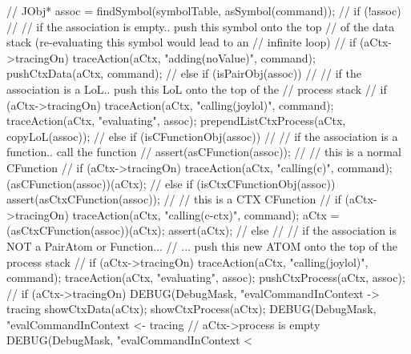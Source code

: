 {{{      //
      JObj* assoc = findSymbol(symbolTable, asSymbol(command));
      //
      if (!assoc) {
        //
        // if the association is empty.. push this symbol onto the top
        // of the data stack (re-evaluating this symbol would lead to an
        // infinite loop)
        //
        if (aCtx->tracingOn)
          traceAction(aCtx, "adding(noValue)", command);
        pushCtxData(aCtx, command);
        //
      } else if (isPairObj(assoc)) {
        //
        // if the association is a LoL.. push this LoL onto the top of the
        // process stack
        //
        if (aCtx->tracingOn) {
          traceAction(aCtx, "calling(joylol)", command);
          traceAction(aCtx, "evaluating",      assoc);
        }
        prependListCtxProcess(aCtx, copyLoL(assoc));
        //
      } else if (isCFunctionObj(assoc)) {
        //
        // if the association is a function.. call the function
        //
        assert(asCFunction(assoc));
        //
        // this is a normal CFunction
        //
        if (aCtx->tracingOn)
          traceAction(aCtx, "calling(c)", command);
        (asCFunction(assoc))(aCtx);
        //
      } else if (isCtxCFunctionObj(assoc)) {
        assert(asCtxCFunction(assoc));
        //
        // this is a CTX CFunction
        //
        if (aCtx->tracingOn) 
          traceAction(aCtx, "calling(c-ctx)", command);
        aCtx = (asCtxCFunction(assoc))(aCtx);
        assert(aCtx);
        //
      } else {
        //
        // if the association is NOT a PairAtom or Function...
        // ... push this new ATOM onto the top of the process stack
        //
        if (aCtx->tracingOn) {
          traceAction(aCtx, "calling(joylol)", command);
          traceAction(aCtx, "evaluating",      assoc);
        }
        pushCtxProcess(aCtx, assoc);
        //
      }
    }
    if (aCtx->tracingOn) {
      DEBUG(DebugMask, "evalCommandInContext -> tracing%
      showCtxData(aCtx);
      showCtxProcess(aCtx);
      DEBUG(DebugMask, "evalCommandInContext <- tracing%
    }
  } // aCtx->process is empty
  DEBUG(DebugMask, "evalCommandInContext < %
}

\stopCCode